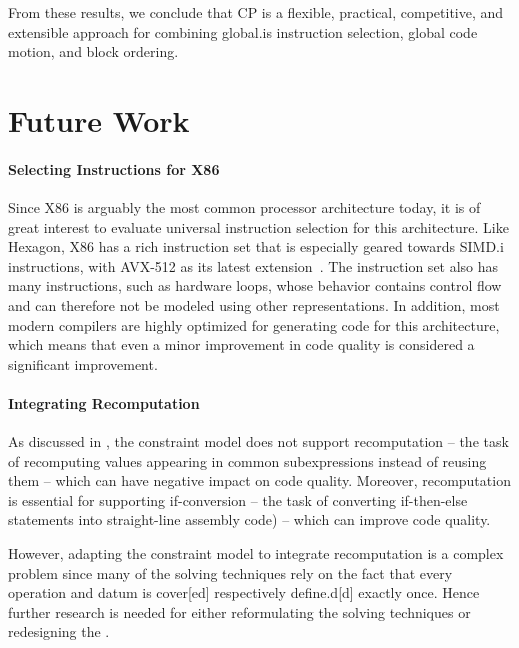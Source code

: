 From these results, we conclude that \glsdesc{CP} is a flexible, practical,
competitive, and extensible approach for combining \gls{global.is}
\gls{instruction selection}, \gls{global code motion}, and \gls{block ordering}.


\section{Future Work}

\paragraph{Selecting Instructions for X86}

Since \gls{X86} is arguably the most common processor architecture today, it is
of great interest to evaluate \gls{universal instruction selection} for this
architecture.
%
Like \gls{Hexagon}, \gls{X86} has a rich \gls{instruction set} that is
especially geared towards \gls{SIMD.i} \glspl{instruction}, with \gls{AVX}-512
as its latest extension~\cite{Intel64:2015}.
%
The \gls{instruction set} also has many \glspl{instruction}, such as hardware
loops, whose behavior contains control flow and can therefore not be modeled
using other representations.
%
In addition, most modern \glspl{compiler} are highly optimized for generating
code for this architecture, which means that even a minor improvement in code
quality is considered a significant improvement.


\paragraph{Integrating Recomputation}

As discussed in , the \gls{constraint model} does
not support \gls{recomputation} -- the task of recomputing values appearing in
common subexpressions instead of reusing them -- which can have negative impact
on code quality.
%
Moreover, \gls{recomputation} is essential for supporting \gls{if-conversion} --
the task of converting if-then-else statements into straight-line \gls{assembly
  code}) -- which can improve code quality.

However, adapting the \gls{constraint model} to integrate \gls{recomputation} is
a complex problem since many of the solving techniques rely on the fact that
every \gls{operation} and \gls{datum} is \gls{cover}[ed] respectively
\gls{define.d}[d] exactly once.
%
Hence further research is needed for either reformulating the solving techniques
or redesigning the .


